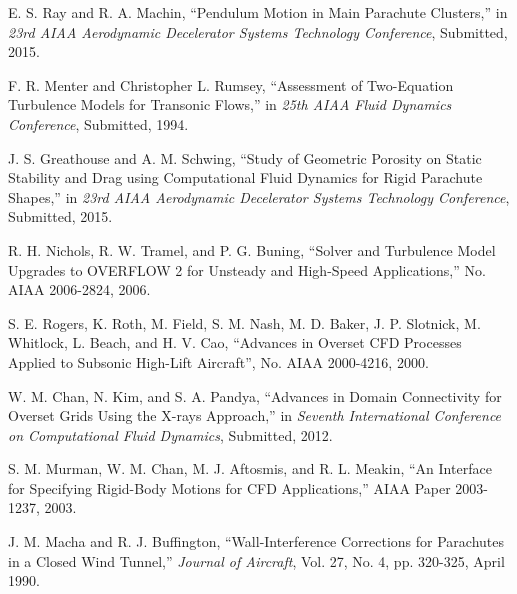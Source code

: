 \documentclass[]{aiaa-tc}%
\begin{document}
\begin{thebibliography}{9}%

 E. S. Ray and R. A. Machin, ``Pendulum Motion in Main Parachute Clusters,'' in {\it 23rd AIAA Aerodynamic Decelerator Systems Technology Conference}, Submitted, 2015.

 F. R. Menter and Christopher L. Rumsey, ``Assessment of Two-Equation Turbulence Models for Transonic Flows,'' in {\it 25th AIAA Fluid Dynamics Conference}, Submitted, 1994.

 J. S. Greathouse and A. M. Schwing, ``Study of Geometric Porosity on Static Stability and Drag using Computational Fluid Dynamics for Rigid Parachute Shapes,'' in {\it 23rd AIAA Aerodynamic Decelerator Systems Technology Conference}, Submitted, 2015.

 R. H. Nichols, R. W. Tramel, and P. G. Buning, “Solver and Turbulence Model Upgrades to OVERFLOW 2 for Unsteady and High-Speed Applications,” No. AIAA 2006-2824, 2006.

 S. E. Rogers, K. Roth, M. Field, S. M. Nash, M. D. Baker, J. P. Slotnick, M. Whitlock, L. Beach, and H. V. Cao, ``Advances in Overset CFD Processes Applied to Subsonic High-Lift Aircraft'', No. AIAA 2000-4216, 2000.

 W. M. Chan, N. Kim, and S. A. Pandya, ``Advances in Domain Connectivity for Overset Grids Using the X-rays Approach,'' in {\it Seventh International Conference on Computational Fluid Dynamics}, Submitted, 2012.

 S. M. Murman, W. M. Chan, M. J. Aftosmis, and R. L. Meakin, ``An Interface for Specifying Rigid-Body Motions for CFD Applications,'' AIAA Paper 2003-1237, 2003.

 J. M. Macha and R. J. Buffington, ``Wall-Interference Corrections for Parachutes in a Closed Wind Tunnel,'' {\it Journal of Aircraft}, Vol. 27, No. 4, pp. 320-325, April 1990.



\end{thebibliography}
\end{document}
